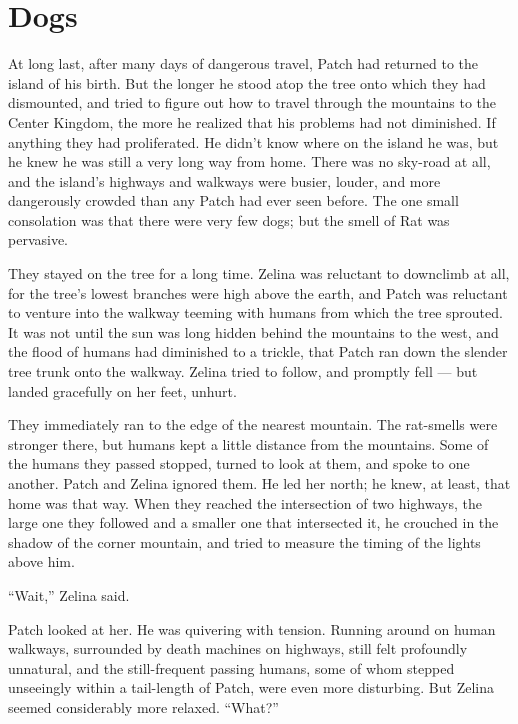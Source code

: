 \documentclass[ebook,oneside,openany,17pt]{memoir}
\newenvironment{tolerant}[1]{%
  \par\tolerance=#1\relax
}{%
  \par
}
\renewcommand{\thechapter}{\Roman{chapter}}
\newcounter{sections}
\newcommand{\sections}[1]{%
  \section*{#1}
  \addtocounter{sections}{1}%
  \pdfbookmark[1]{#1}{section.\thechapter.\thesections}}
\begin{document}
\sections{Dogs}

\begin{tolerant}{1000}
At long last, after many days of dangerous travel, Patch had returned
to the island of his birth. But the longer he stood atop the tree onto
which they had dismounted, and tried to figure out how to travel
through the mountains to the Center Kingdom, the more he realized that
his problems had not diminished. If anything they had proliferated. He
didn’t know where on the island he was, but he knew he was still a
very long way from home. There was no sky-road at all, and the
island’s highways and walkways were busier, louder, and more
dangerously crowd\-ed than any Patch had ever seen before. The one small
consolation was that there were very few dogs; but the smell of Rat
was pervasive.
\end{tolerant}

They stayed on the tree for a long time. Zelina was reluctant to
downclimb at all, for the tree’s lowest branches were high above the
earth, and Patch was reluctant to venture into the walkway teeming
with humans from which the tree sprouted. It was not until the sun was
long hidden behind the mountains to the west, and the flood of humans
had diminished to a trickle, that Patch ran down the slender tree
trunk onto the walkway. Zelina tried to follow, and promptly fell —
but landed gracefully on her feet, unhurt.

They immediately ran to the edge of the nearest mountain. The
rat-smells were stronger there, but humans kept a little distance from
the mountains. Some of the humans they passed stopped, turned to look
at them, and spoke to one another. Patch and Zelina ignored them. He
led her north; he knew, at least, that home was that way. When they
reached the intersection of two highways, the large one they followed
and a smaller one that intersected it, he crouched in the shadow of
the corner mountain, and tried to measure the timing of the lights
above him.

“Wait,” Zelina said.

\begin{tolerant}{1000}
Patch looked at her. He was quivering with tension. Running around on
human walkways, surround\-ed by death machines on highways, still felt
profoundly unnatural, and the still-frequent passing humans, some of
whom stepped unseeingly within a tail-length of Patch, were even more
disturbing. But Zelina seemed considerably more relaxed. “What?”
\end{tolerant}
\end{document}
